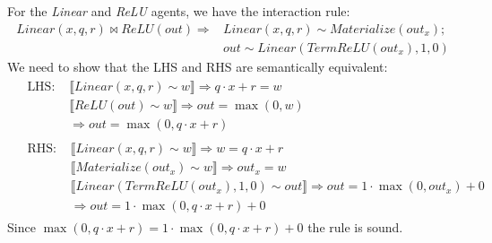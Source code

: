 \begin{lemma}
	For the \textit{Linear} and \textit{ReLU} agents, we have the interaction rule:
	$$
	\begin{aligned}
		\mathit{Linear}(x, q, r) \bowtie \mathit{ReLU}(\mathit{out}) \Rightarrow
		& \mathit{Linear}(x, q, r) \sim \mathit{Materialize}(\mathit{out}_x); \\
		& \mathit{out} \sim \mathit{Linear}(\mathit{TermReLU}(\mathit{out}_x), 1, 0)
	\end{aligned}
	$$
	We need to show that the LHS and RHS are semantically equivalent:
	$$
	\begin{aligned}
		& \begin{aligned}
			\text{LHS: } & \llbracket \mathit{Linear}(x, q, r) \sim w \rrbracket \Rightarrow q \cdot x + r = w \\
			& \llbracket \mathit{ReLU}(\mathit{out}) \sim w \rrbracket \Rightarrow \mathit{out} = \max(0, w) \\
			& \Rightarrow \mathit{out} = \max(0, q \cdot x + r)
		\end{aligned} \\
		& \begin{aligned}
			\text{RHS: } & \llbracket \mathit{Linear}(x, q, r) \sim w \rrbracket \Rightarrow w = q \cdot x + r \\
			& \llbracket \mathit{Materialize}(\mathit{out}_x) \sim w \rrbracket \Rightarrow \mathit{out}_x = w \\
			& \llbracket \mathit{Linear}(\mathit{TermReLU}(\mathit{out}_x), 1, 0) \sim \mathit{out} \rrbracket \Rightarrow \mathit{out} = 1 \cdot \max(0, \mathit{out}_x) + 0 \\
			& \Rightarrow \mathit{out} = 1 \cdot \max(0, q \cdot x + r) + 0
		\end{aligned}
	\end{aligned}
	$$
	Since $\max(0, q \cdot x + r) = 1 \cdot \max(0, q \cdot x + r) + 0$ the rule is sound.
\end{lemma}

